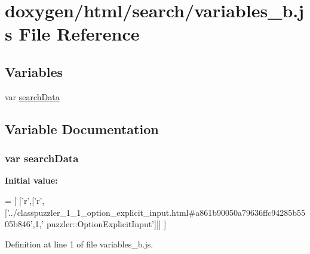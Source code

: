 \hypertarget{a00115}{}\section{doxygen/html/search/variables\+\_\+b.js File Reference}
\label{a00115}
\subsection*{Variables}
\begin{DoxyCompactItemize}
\item 
var \hyperlink{a00115_ad01a7523f103d6242ef9b0451861231e}{search\+Data}
\end{DoxyCompactItemize}


\subsection{Variable Documentation}
\hypertarget{a00115_ad01a7523f103d6242ef9b0451861231e}{}
\subsubsection[{search\+Data}]{\setlength{\rightskip}{0pt plus 5cm}var search\+Data}\label{a00115_ad01a7523f103d6242ef9b0451861231e}
{\bfseries Initial value\+:}
\begin{DoxyCode}
=
[
  [\textcolor{charliteral}{'r'},[\textcolor{charliteral}{'r'},[\textcolor{stringliteral}{'../classpuzzler\_1\_1\_option\_explicit\_input.html#a861b90050a79636ffc94285b5505b846'},1,\textcolor{stringliteral}{'
      puzzler::OptionExplicitInput'}]]]
]
\end{DoxyCode}


Definition at line 1 of file variables\+\_\+b.\+js.


